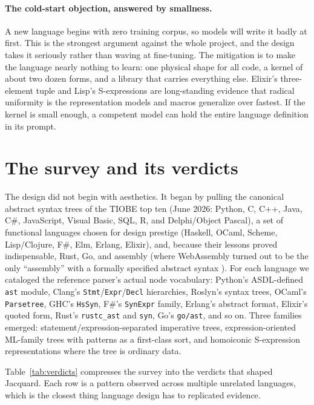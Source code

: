 \documentclass[11pt]{article}
\newcommand{\jacquard}{Jacquard}
\begin{document}
\paragraph{The cold-start objection, answered by smallness.}
A new language begins with zero training corpus, so models will write it badly at first. This is the strongest argument against the whole project, and the design takes it seriously rather than waving at fine-tuning. The mitigation is to make the language nearly nothing to learn: one physical shape for all code, a kernel of about two dozen forms, and a library that carries everything else. Elixir's three-element tuple and Lisp's S-expressions are long-standing evidence that radical uniformity is the representation models and macros generalize over fastest. If the kernel is small enough, a competent model can hold the entire language definition in its prompt.

\section{The survey and its verdicts}
\label{sec:survey}

The design did not begin with aesthetics. It began by pulling the canonical abstract syntax trees of the TIOBE top ten (June 2026: Python, C, C++, Java, C\#, JavaScript, Visual Basic, SQL, R, and Delphi/Object Pascal), a set of functional languages chosen for design prestige (Haskell, OCaml, Scheme, Lisp/Clojure, F\#, Elm, Erlang, Elixir), and, because their lessons proved indispensable, Rust, Go, and assembly (where WebAssembly turned out to be the only ``assembly'' with a formally specified abstract syntax \cite{wasm}). For each language we cataloged the reference parser's actual node vocabulary: Python's ASDL-defined \texttt{ast} module, Clang's \texttt{Stmt}/\texttt{Expr}/\texttt{Decl} hierarchies, Roslyn's syntax trees, OCaml's \texttt{Parsetree}, GHC's \texttt{HsSyn}, F\#'s \texttt{SynExpr} family, Erlang's abstract format, Elixir's quoted form, Rust's \texttt{rustc\_ast} and \texttt{syn}, Go's \texttt{go/ast}, and so on. Three families emerged: statement/expression-separated imperative trees, expression-oriented ML-family trees with patterns as a first-class sort, and homoiconic S-expression representations where the tree is ordinary data.

Table~\ref{tab:verdicts} compresses the survey into the verdicts that shaped \jacquard. Each row is a pattern observed across multiple unrelated languages, which is the closest thing language design has to replicated evidence.
\end{document}
